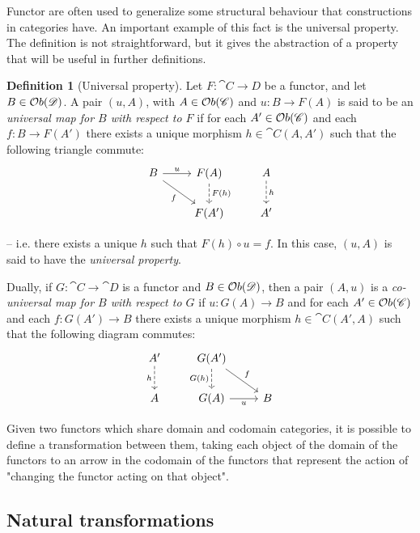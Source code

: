 \documentclass[a4paper, twoside,openright]{report}
\theoremstyle{plain}
\theoremstyle{definition}
\newtheorem{definition}[theorem]{Definition}
\begin{document}
Functor are often used to generalize some structural behaviour that constructions in categories have. An important example of this fact is the universal property. The definition is not straightforward, but it gives the abstraction of a property that will be useful in further definitions.~\cite{Herrlich_Strecker_1979}

\begin{definition}[Universal property]\label{def:univ_prop}
    Let $F: \cat{C \rightarrow D}$ be a functor, and let $B \in \mathcal{O}b(\mathscr{D})$. A pair $(u, A)$, with $A \in \mathcal{O}b(\mathscr{C})$ and $u: B \rightarrow F(A)$ is said to be an \emph{universal map for $B$ with respect to $F$} if for each $A' \in \mathcal{O}b(\mathscr{C})$ and each $f: B \rightarrow F(A')$ there exists a unique morphism $h \in \cat C(A, A')$ such that the following triangle commute:
    \[
        \begin{tikzcd}
            B \arrow[r, "u"] \arrow[dr, "f" swap] & F(A) \arrow[d, dashed, "F(h)"] & A \arrow[d, dashed, "h"]\\
            & F(A') & A'
        \end{tikzcd}
    \]

    -- i.e. there exists a unique $h$ such that $F(h) \circ u = f$. In this case, $(u, A)$ is said to have the \emph{universal property}.

    Dually, if $G: \cat C \rightarrow \cat D$ is a functor and $B \in \mathcal{O}b(\mathscr{D})$, then a pair $(A, u)$ is a \emph{co-universal map for $B$ with respect to $G$} if $u:G(A) \rightarrow B$ and for each $A' \in \mathcal{O}b(\mathscr{C})$ and each $f: G(A') \rightarrow B$ there exists a unique morphism $h \in \cat{C}(A', A)$ such that the following diagram commutes:
    \[
        \begin{tikzcd}
            A' \arrow[d, dashed, "h" swap] & G(A') \arrow[d, dashed, "G(h)" swap] \arrow[dr, "f"] \\
            A & G(A) \arrow[r, "u" swap] & B
        \end{tikzcd}
    \]
\end{definition}

Given two functors which share domain and codomain categories, it is possible to define a transformation between them, taking each object of the domain of the functors to an arrow in the codomain of the functors that represent the action of "changing the functor acting on that object".

\subsection{Natural transformations}
\end{document}

